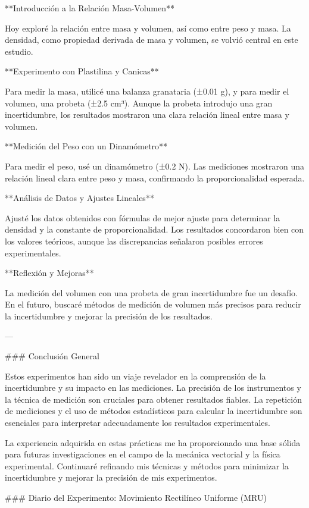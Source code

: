 \documentclass[journal]{IEEEtran}
\begin{document}
**Introducción a la Relación Masa-Volumen**

Hoy exploré la relación entre masa y volumen, así como entre peso y masa. La densidad, como propiedad derivada de masa y volumen, se volvió central en este estudio. 

**Experimento con Plastilina y Canicas**

Para medir la masa, utilicé una balanza granataria (±0.01 g), y para medir el volumen, una probeta (±2.5 cm³). Aunque la probeta introdujo una gran incertidumbre, los resultados mostraron una clara relación lineal entre masa y volumen.

**Medición del Peso con un Dinamómetro**

Para medir el peso, usé un dinamómetro (±0.2 N). Las mediciones mostraron una relación lineal clara entre peso y masa, confirmando la proporcionalidad esperada.

**Análisis de Datos y Ajustes Lineales**

Ajusté los datos obtenidos con fórmulas de mejor ajuste para determinar la densidad y la constante de proporcionalidad. Los resultados concordaron bien con los valores teóricos, aunque las discrepancias señalaron posibles errores experimentales.

**Reflexión y Mejoras**

La medición del volumen con una probeta de gran incertidumbre fue un desafío. En el futuro, buscaré métodos de medición de volumen más precisos para reducir la incertidumbre y mejorar la precisión de los resultados.

---

### Conclusión General

Estos experimentos han sido un viaje revelador en la comprensión de la incertidumbre y su impacto en las mediciones. La precisión de los instrumentos y la técnica de medición son cruciales para obtener resultados fiables. La repetición de mediciones y el uso de métodos estadísticos para calcular la incertidumbre son esenciales para interpretar adecuadamente los resultados experimentales.

La experiencia adquirida en estas prácticas me ha proporcionado una base sólida para futuras investigaciones en el campo de la mecánica vectorial y la física experimental. Continuaré refinando mis técnicas y métodos para minimizar la incertidumbre y mejorar la precisión de mis experimentos.

### Diario del Experimento: Movimiento Rectilíneo Uniforme (MRU)
\end{document}
